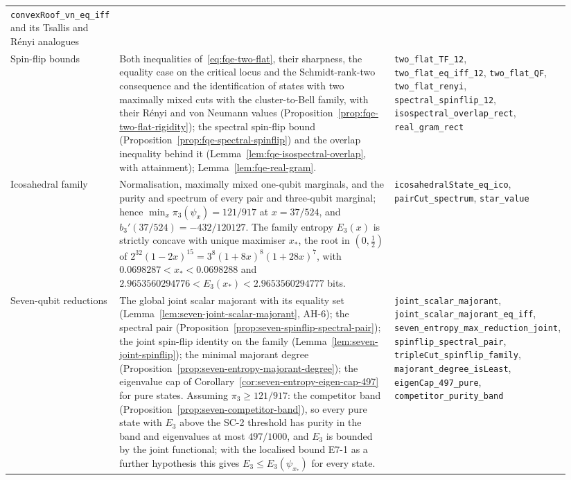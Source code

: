 {\begin{longtable}{@{}>{\raggedright\arraybackslash}p{0.14\linewidth}>{\raggedright\arraybackslash}p{0.49\linewidth}>{\raggedright\arraybackslash}p{0.31\linewidth}@{}}
\texttt{convexRoof\_vn\_eq\_iff} and its Tsallis and R\'enyi analogues\\
Spin-flip bounds &
Both inequalities of~\eqref{eq:fqe-two-flat}, their sharpness, the equality case on the critical locus and the
Schmidt-rank-two consequence and the identification of states with two maximally mixed cuts with the cluster-to-Bell
family, with their R\'enyi and von Neumann values (Proposition~\ref{prop:fqe-two-flat-rigidity}); the spectral spin-flip bound
(Proposition~\ref{prop:fqe-spectral-spinflip}) and the overlap inequality behind it
(Lemma~\ref{lem:fqe-isospectral-overlap}, with attainment); Lemma~\ref{lem:fqe-real-gram}. &
\texttt{two\_flat\_TF\_12}, \texttt{two\_flat\_eq\_iff\_12}, \texttt{two\_flat\_QF}, \texttt{two\_flat\_renyi}, \texttt{spectral\_spinflip\_12}, \texttt{isospectral\_overlap\_rect},
\texttt{real\_gram\_rect}\\
Icosahedral family &
Normalisation, maximally mixed one-qubit marginals, and the purity and spectrum of every pair and three-qubit marginal;
hence $\min_x\pi_3(\psi_x)=121/917$ at $x=37/524$, and $b_3'(37/524)=-432/120127$. The family entropy $E_3(x)$ is strictly
concave with unique maximiser $x_*$, the root in $(0,\tfrac12)$ of $2^{32}(1-2x)^{15}=3^8(1+8x)^8(1+28x)^7$, with
$0.0698287<x_*<0.0698288$ and $2.9653560294776<E_3(x_*)<2.9653560294777$ bits. &
\texttt{icosahedralState\_eq\_ico}, \texttt{pairCut\_spectrum}, \texttt{star\_value}\\
Seven-qubit reductions &
The global joint scalar majorant with its equality set (Lemma~\ref{lem:seven-joint-scalar-majorant}, AH-6); the spectral pair
(Proposition~\ref{prop:seven-spinflip-spectral-pair}); the joint spin-flip identity on the family (Lemma~\ref{lem:seven-joint-spinflip});
the minimal majorant degree (Proposition~\ref{prop:seven-entropy-majorant-degree}); the eigenvalue cap of
Corollary~\ref{cor:seven-entropy-eigen-cap-497} for pure states. Assuming $\pi_3\ge121/917$: the competitor band
(Proposition~\ref{prop:seven-competitor-band}), so every pure state with $E_3$ above the SC-2 threshold has purity in the band and
eigenvalues at most $497/1000$, and $E_3$ is bounded by the joint functional; with the localised bound E7-1 as a further hypothesis this
gives $E_3\le E_3(\psi_{x_*})$ for every state. &
\texttt{joint\_scalar\_majorant}, \texttt{joint\_scalar\_majorant\_\allowbreak eq\_iff}, \texttt{seven\_entropy\_max\_\allowbreak reduction\_joint},
\texttt{spinflip\_spectral\_pair}, \texttt{tripleCut\_\allowbreak spinflip\_family}, \texttt{majorant\_degree\_isLeast},
\texttt{eigenCap\_497\_pure}, \texttt{competitor\_\allowbreak purity\_band}\\

\end{longtable}}
